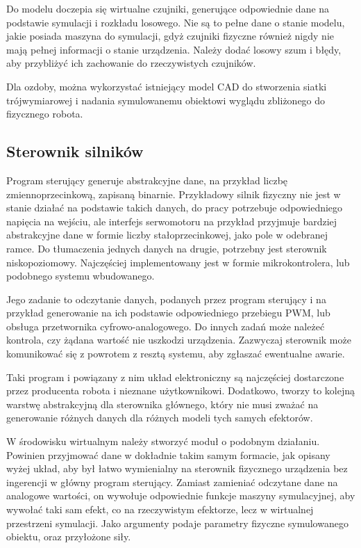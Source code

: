 		Do modelu doczepia się wirtualne czujniki, generujące odpowiednie dane na podstawie symulacji i rozkładu losowego.
		Nie są to pełne dane o stanie modelu, jakie posiada maszyna do symulacji, gdyż czujniki fizyczne również nigdy nie mają pełnej informacji o stanie urządzenia.
		Należy dodać losowy szum i błędy, aby przybliżyć ich zachowanie do rzeczywistych czujników.

		Dla ozdoby, można wykorzystać istniejący model CAD do stworzenia siatki trójwymiarowej i nadania symulowanemu obiektowi wyglądu zbliżonego do fizycznego robota.

	\subsection{Sterownik silników}
		Program sterujący generuje abstrakcyjne dane, na przykład liczbę zmiennoprzecinkową, zapisaną binarnie.
		Przykładowy silnik fizyczny nie jest w stanie działać na podstawie takich danych, do pracy potrzebuje odpowiedniego napięcia na wejściu,
		ale interfejs serwomotoru na przykład przyjmuje bardziej abstrakcyjne dane w formie liczby stałoprzecinkowej, jako pole w odebranej ramce.
		Do tłumaczenia jednych danych na drugie, potrzebny jest sterownik niskopoziomowy.
		Najczęściej implementowany jest w formie mikrokontrolera, lub podobnego systemu wbudowanego.

		Jego zadanie to odczytanie danych, podanych przez program sterujący i na przykład generowanie na ich podstawie odpowiedniego przebiegu PWM, lub obsługa przetwornika cyfrowo-analogowego.
		Do innych zadań może należeć kontrola, czy żądana wartość nie uszkodzi urządzenia.
		Zazwyczaj sterownik może komunikować się z powrotem z resztą systemu, aby zgłaszać ewentualne awarie.

		Taki program i powiązany z nim układ elektroniczny są najczęściej dostarczone przez producenta robota i nieznane użytkownikowi.
		Dodatkowo, tworzy to kolejną warstwę abstrakcyjną dla sterownika głównego, który nie musi zważać na generowanie różnych danych dla różnych modeli tych samych efektorów.
		
		W środowisku wirtualnym należy stworzyć moduł o podobnym działaniu.
		Powinien przyjmować dane w dokładnie takim samym formacie, jak opisany wyżej układ, aby był łatwo wymienialny na sterownik fizycznego urządzenia bez ingerencji w główny program sterujący.
		Zamiast zamieniać odczytane dane na analogowe wartości, on wywołuje odpowiednie funkcje maszyny symulacyjnej, aby wywołać taki sam efekt, co na rzeczywistym efektorze, lecz w wirtualnej przestrzeni symulacji.
		Jako argumenty podaje parametry fizyczne symulowanego obiektu, oraz przyłożone siły.
		

